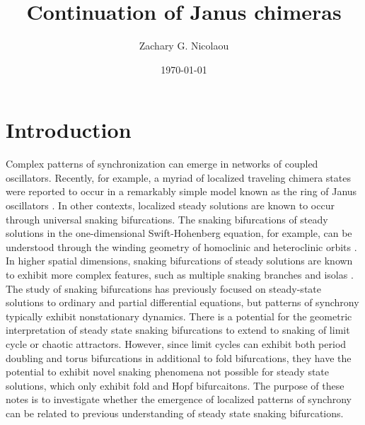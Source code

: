 \documentclass[aps,pre,amsmath,amssymb,floatfix,onecolumn,notitlepage,10pt]{revtex4-1}
\begin{document}
\title{Continuation of Janus chimeras}
\author{Zachary G. Nicolaou}
\date{\today}

\maketitle

\section{Introduction}
Complex patterns of synchronization can emerge in networks of coupled oscillators.  Recently, for example, a myriad of localized traveling chimera states were reported to occur in a remarkably simple model known as the ring of Janus oscillators \cite{2019_Nicolaou}. In other contexts, localized steady solutions are known to occur through universal snaking bifurcations. The snaking bifurcations of steady solutions in the one-dimensional Swift-Hohenberg equation, for example, can be understood through the winding geometry of homoclinic and heteroclinic orbits \cite{2006_burke, 2009_beck}. In higher spatial dimensions, snaking bifurcations of steady solutions are known to exhibit  more complex features, such as multiple snaking branches and isolas \cite{2019_bramburger,2020_bramburger}. The study of snaking bifurcations has previously focused on steady-state solutions to ordinary and partial differential equations, but patterns of synchrony typically exhibit nonstationary dynamics.  There is a potential for the geometric interpretation of steady state snaking bifurcations to extend to snaking of limit cycle or chaotic attractors. However, since limit cycles can exhibit both period doubling and torus bifurcations in additional to fold bifurcations, they have the potential to exhibit novel snaking phenomena not possible for steady state solutions, which only exhibit fold and Hopf bifurcaitons.  The purpose of these notes is to investigate whether the emergence of localized patterns of synchrony can be related to previous understanding of steady state snaking bifurcations.
\end{document}
